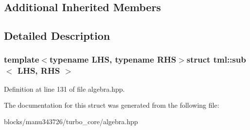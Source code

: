 \subsection*{Additional Inherited Members}


\subsection{Detailed Description}
\subsubsection*{template$<$typename L\+H\+S, typename R\+H\+S$>$struct tml\+::sub$<$ L\+H\+S, R\+H\+S $>$}



Definition at line 131 of file algebra.\+hpp.



The documentation for this struct was generated from the following file\+:\begin{DoxyCompactItemize}
\item 
blocks/manu343726/turbo\+\_\+core/algebra.\+hpp\end{DoxyCompactItemize}
